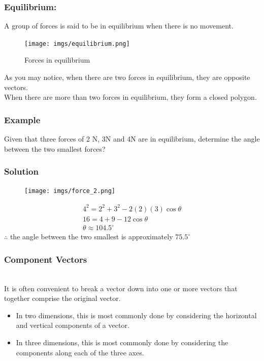 \documentclass{article}
\begin{document}
\subsubsection{Equilibrium:} A group of forces is said to be in equilibrium when there is no movement.
\begin{figure}[h]
    \centering
    \texttt{[image: imgs/equilibrium.png]}
    \caption{Forces in equilibrium}
\end{figure}

As you may notice, when there are two forces in equilibrium, they are opposite vectors.\\
When there are more than two forces in equilibrium, they form a closed polygon.
\subsubsection*{Example}
Given that three forces of 2 N, 3N and 4N are in equilibrium, determine the angle between the two smallest forces?
\subsubsection*{Solution}
\begin{figure}[h]
    \centering
    \texttt{[image: imgs/force\_2.png]}
\end{figure}
\begin{align*}
    4^2=2^2+3^2-2(2)(3)\cos \theta\\
    16=4+9-12\cos \theta\\
    \theta \approx 104.5^{\circ}
\end{align*}
$\therefore$ the angle between the two smallest is approximately $75.5^{\circ}$
\newpage 

\subsubsection{Component Vectors}\\
It is often convenient to break a vector down into one or more vectors that together comprise the original vector.  
\begin{itemize}
    \item In two dimensions, this is most commonly done by considering the horizontal and vertical components of a vector.  
    \item In three dimensions, this is most commonly done by considering the components along each of the three axes.
\end{itemize}
\end{document}
